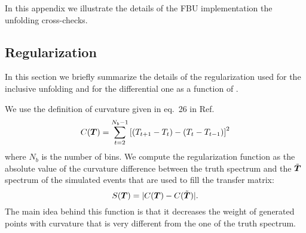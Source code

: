 In this appendix we illustrate the details of the FBU implementation
the unfolding cross-checks.

\subsection{Regularization}
\label{sec:app:unfolding:regularization}
In this section we briefly summarize the details of the regularization
used for the inclusive unfolding and for the differential one as a
function of \pttt{}.

We use the definition of curvature given in eq.~26 in
Ref.~\cite{Fbu2012arXiv1201.4612C}
%
\begin{equation}
        C(\boldsymbol{T}{}) =
        \sum_{t=2}^{N_b-1}\left[(T_{t+1}-T_{t})-(T_t-T_{t-1})\right]^2
\end{equation}
%
where $N_b$ is the number of bins. We compute the regularization
function as the absolute value of the curvature difference between the
truth spectrum and the $\tilde{\boldsymbol{T}{}}$ spectrum of the simulated
events that are used to fill the transfer matrix:
%
\begin{equation}
 S(\boldsymbol{T}{}) = |C(\boldsymbol{T}) - C(\tilde{\boldsymbol{T}{}})|.
\end{equation}
%
The main idea behind this function is that it decreases the weight of
generated points \Truth{} with curvature that is very different from
the one of the truth spectrum.

